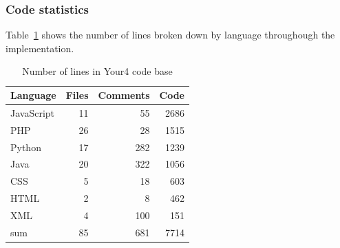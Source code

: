 \subsubsection{Code statistics}

Table~\ref{tab:metrics} shows the number of lines broken down by language throughough the implementation.
\nopagebreak
\begin{table}[H]
	\centering
	\begin{tabular}{l r r r}
		\toprule
		\textbf{Language} & \textbf{Files} & \textbf{Comments} & \textbf{Code} \\
		\midrule
		JavaScript & 11 & 55 & 2686 \\ 
		PHP & 26 & 28 & 1515 \\ 
		Python & 17 & 282 & 1239 \\ 
		Java & 20 & 322 & 1056 \\ 
		CSS & 5 & 18 & 603 \\ 
		HTML & 2 & 8 & 462 \\ 
		XML & 4 & 100 & 151 \\ 
		\midrule
		sum & 85 & 681 & 7714 \\ 
		\bottomrule
	\end{tabular}
	\caption{Number of lines in Your4 code base}
	\label{tab:metrics}
\end{table}


